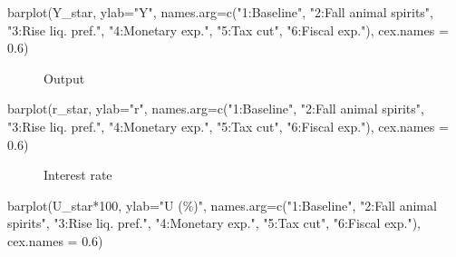 \documentclass[
  letterpaper,
  DIV=11,
  numbers=noendperiod]{scrreprt}
\newenvironment{Shaded}{\begin{snugshade}}{\end{snugshade}}
\newcommand{\AttributeTok}[1]{\textcolor[rgb]{0.40,0.45,0.13}{#1}}
\newcommand{\DecValTok}[1]{\textcolor[rgb]{0.68,0.00,0.00}{#1}}
\newcommand{\FloatTok}[1]{\textcolor[rgb]{0.68,0.00,0.00}{#1}}
\newcommand{\FunctionTok}[1]{\textcolor[rgb]{0.28,0.35,0.67}{#1}}
\newcommand{\NormalTok}[1]{\textcolor[rgb]{0.00,0.23,0.31}{#1}}
\newcommand{\SpecialCharTok}[1]{\textcolor[rgb]{0.37,0.37,0.37}{#1}}
\newcommand{\StringTok}[1]{\textcolor[rgb]{0.13,0.47,0.30}{#1}}
\begin{document}
\begin{Shaded}
\begin{Highlighting}[]
\FunctionTok{barplot}\NormalTok{(Y\_star, }\AttributeTok{ylab=}\StringTok{"Y"}\NormalTok{, }\AttributeTok{names.arg=}\FunctionTok{c}\NormalTok{(}\StringTok{"1:Baseline"}\NormalTok{, }\StringTok{"2:Fall animal spirits"}\NormalTok{, }\StringTok{"3:Rise liq. pref."}\NormalTok{,}
                                      \StringTok{"4:Monetary exp."}\NormalTok{, }\StringTok{"5:Tax cut"}\NormalTok{, }\StringTok{"6:Fiscal exp."}\NormalTok{), }\AttributeTok{cex.names =} \FloatTok{0.6}\NormalTok{)}
\end{Highlighting}
\end{Shaded}

\begin{figure}[H]


\caption{\label{fig-output}Output}

\end{figure}%

\begin{Shaded}
\begin{Highlighting}[]
\FunctionTok{barplot}\NormalTok{(r\_star, }\AttributeTok{ylab=}\StringTok{"r"}\NormalTok{, }\AttributeTok{names.arg=}\FunctionTok{c}\NormalTok{(}\StringTok{"1:Baseline"}\NormalTok{, }\StringTok{"2:Fall animal spirits"}\NormalTok{, }\StringTok{"3:Rise liq. pref."}\NormalTok{,}
                                      \StringTok{"4:Monetary exp."}\NormalTok{, }\StringTok{"5:Tax cut"}\NormalTok{, }\StringTok{"6:Fiscal exp."}\NormalTok{), }\AttributeTok{cex.names =} \FloatTok{0.6}\NormalTok{)}
\end{Highlighting}
\end{Shaded}

\begin{figure}[H]


\caption{\label{fig-r}Interest rate}

\end{figure}%

\begin{Shaded}
\begin{Highlighting}[]
\FunctionTok{barplot}\NormalTok{(U\_star}\SpecialCharTok{*}\DecValTok{100}\NormalTok{, }\AttributeTok{ylab=}\StringTok{"U (\%)"}\NormalTok{, }\AttributeTok{names.arg=}\FunctionTok{c}\NormalTok{(}\StringTok{"1:Baseline"}\NormalTok{, }\StringTok{"2:Fall animal spirits"}\NormalTok{, }\StringTok{"3:Rise liq. pref."}\NormalTok{,}
                                              \StringTok{"4:Monetary exp."}\NormalTok{, }\StringTok{"5:Tax cut"}\NormalTok{, }\StringTok{"6:Fiscal exp."}\NormalTok{), }\AttributeTok{cex.names =} \FloatTok{0.6}\NormalTok{)}
\end{Highlighting}
\end{Shaded}
\end{document}
